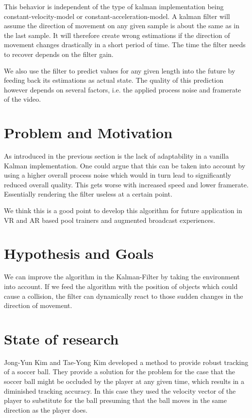 \documentclass[titlepage, a4paper, 11pt]{scrartcl}
\begin{document}
    This behavior is independent of the type of kalman implementation being constant-velocity-model or constant-acceleration-model.
    A kalman filter will assume the direction of movement on any given sample is about the same as in the last sample. 
    It will therefore create wrong estimations if the direction of movement changes drastically in a short period of time. The time the filter needs to recover depends on the filter gain.

    We also use the filter to predict values for any given length into the future by feeding back its estimations as actual state. 
    The quality of this prediction however depends on several factors, i.e. the applied process noise and framerate of the video.

    \section{Problem and Motivation}
    As introduced in the previous section is the lack of adaptability in a vanilla Kalman implementation.
    One could argue that this can be taken into account by using a higher overall process noise which would in turn lead to significantly reduced overall quality.
    This gets worse with increased speed and lower framerate. Essentially rendering the filter useless at a certain point.

    We think this is a good point to develop this algorithm for future application in VR and AR based pool trainers and augmented broadcast experiences.

    \section{Hypothesis and Goals}

    We can improve the algorithm in the Kalman-Filter by taking the environment into account.
    If we feed the algorithm with the position of objects which could cause a collision,
    the filter can dynamically react to those sudden changes in the direction of movement.

    \section{State of research}

    Jong-Yun Kim and Tae-Yong Kim \cite{kim} developed a method to provide robust tracking of a soccer ball. 
    They provide a solution for the problem for the case that the soccer ball might be occluded by the player at any given time,
    which results in a diminished tracking accuracy. 
    In this case they used the velocity vector of the player to substitute for the ball presuming that the ball moves in the same direction as the player does.
\end{document}
